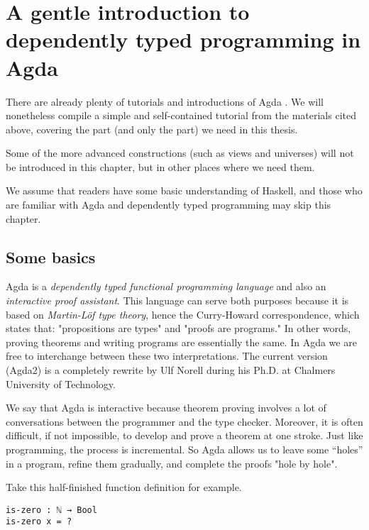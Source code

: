 \documentclass[../thesis.tex]{subfiles}
\begin{document}
\chapter{A gentle introduction to dependently typed programming in Agda}\label{agda}


There are already plenty of tutorials and introductions of Agda
\cite{norell2009dependently}\cite{FLOLAC16DTP}\cite{brutal}.
We will nonetheless compile a simple and self-contained tutorial from the
materials cited above, covering the part (and only the part) we need in this thesis.

Some of the more advanced constructions (such as views and universes) will not
be introduced in this chapter, but in other places where we need them.

We assume that readers have some basic understanding of Haskell, and those
who are familiar with Agda and dependently typed programming may skip this chapter.

\section{Some basics}


Agda is a \textit{dependently typed functional programming language} and also an
\textit{interactive proof assistant}. This language can serve both purposes because
it is based on \textit{Martin-Löf type theory}\cite{martin1984intuitionistic},
hence the Curry-Howard correspondence\cite{sorensen2006lectures},
which states that: "propositions are types" and "proofs are programs."
In other words, proving theorems and writing programs are essentially the same.
In Agda we are free to interchange between these two interpretations.
The current version (Agda2) is a completely rewrite by Ulf Norell during his
Ph.D. at Chalmers University of Technology.

We say that Agda is interactive because theorem proving involves a lot of
conversations between the programmer and the type checker.
Moreover, it is often difficult, if not impossible, to develop and prove a theorem at one stroke.
Just like programming, the process is incremental.
So Agda allows us to leave some ``holes'' in a program, refine them gradually, and
complete the proofs "hole by hole".

Take this half-finished function definition for example.

\begin{lstlisting}
is-zero : ℕ → Bool
is-zero x = ?
\end{lstlisting}
\end{document}
